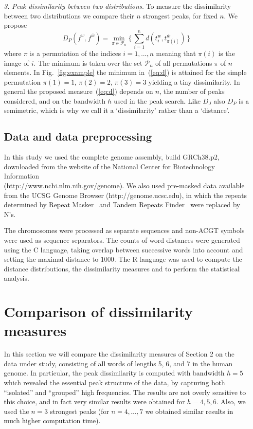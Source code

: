 \documentclass[review,12pt]{elsarticle}
\begin{document}
{\it 3. Peak dissimilarity between two
distributions.}
To measure the dissimilarity between two
distributions we compare their $n$ strongest
peaks, for fixed $n$. We propose
%
\begin{equation}
  D_P(f^w, f^{\bar{w}})=
	  \min_{\pi\in\mathcal{P}_n}
    \{\,\sum_{i=1}^n d(t^w_i,
		t^{\bar{w}}_{\pi(i)}) \,\}
\label{eq:d}
\end{equation}
%
where $\pi$ is a permutation of the indices
$i=1,\ldots,n$ meaning that $\pi(i)$ is the
image of $i$. The minimum is taken over the set
$\mathcal{P}_n$ of all permutations $\pi$
of $n$ elements.
In Fig.~\ref{fig:example} the minimum
in~(\ref{eq:d}) is attained for the simple
permutation $\pi(1)=1$, $\pi(2)=2$,
$\pi(3)=3$ yielding a tiny dissimilarity.
In general the proposed
measure~(\ref{eq:d}) depends on $n$,
the number of peaks considered, and on the
bandwidth $h$ used in the peak search.
Like $D_J$ also $D_P$ is a semimetric,
which is why we call it a
`dissimilarity' rather than a `distance'.

\subsection{Data and data preprocessing}
In this study we used the complete genome assembly,
build GRCh38.p2, downloaded from the website of the
National Center for Biotechnology Information\\
(http://www.ncbi.nlm.nih.gov/genome). We also used
pre-masked data available from the UCSG Genome
Browser (http://genome.ucsc.edu), in which the
repeats determined by Repeat
Masker~\cite{repeatMasker} and Tandem Repeats
Finder~\cite{benson1999} were replaced by N's.

The chromosomes were processed as separate sequences
and non-ACGT symbols were used as sequence separators.
The counts of word distances were generated using the C
language, taking overlap between successive words
into account and setting the maximal distance to 1000.
The R language was used to compute the distance
distributions, the dissimilarity measures and to
perform the statistical analysis.




\section{Comparison of dissimilarity measures}
In this section we will compare the dissimilarity
measures of Section 2 on the data under study,
consisting of all words of lengths 5, 6, and 7
in the human genome. In particular, the peak
dissimilarity is computed with bandwidth $h=5$
which revealed the essential peak structure
of the data, by capturing both ``isolated'' and
``grouped'' high frequencies.
The results are not overly sensitive to this choice,
and in fact very similar results were obtained for
$h=4,5,6$.
%
Also, we used the $n=3$ strongest peaks (for
$n=4,\ldots,7$ we obtained similar results in
much higher computation time).
\end{document}
